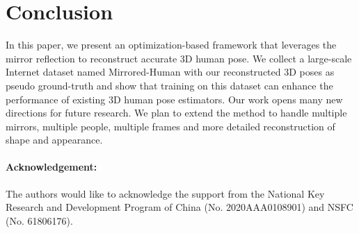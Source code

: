 \section{Conclusion}
In this paper, we present an optimization-based framework that leverages the mirror reflection to reconstruct accurate 3D human pose. We collect a large-scale Internet dataset named Mirrored-Human with our reconstructed 3D poses as pseudo ground-truth and show that training on this dataset can enhance the performance of existing 3D human pose estimators. Our work opens many new directions for future research. We plan to extend the method to handle multiple mirrors, multiple people, multiple frames and more detailed reconstruction of shape and appearance.
\paragraph{Acknowledgement: }The authors would like to acknowledge the support from the National Key Research and Development Program of China (No. 2020AAA0108901) and NSFC (No. 61806176).


